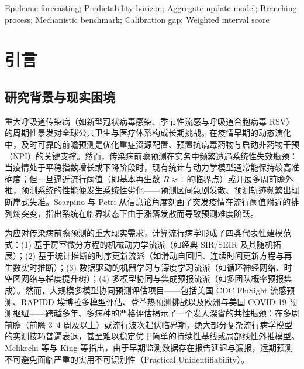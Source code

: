 \documentclass[11pt,a4paper]{article}
\theoremstyle{plain}
\theoremstyle{definition}
\begin{document}
\vspace{0.8em}
 Epidemic forecasting; Predictability horizon; Aggregate update model; Branching process; Mechanistic benchmark; Calibration gap; Weighted interval score

\vspace{1.5em}

\section{引言}\label{sec:intro}

\subsection{研究背景与现实困境}

重大呼吸道传染病（如新型冠状病毒感染、季节性流感与呼吸道合胞病毒 RSV）的周期性暴发对全球公共卫生与医疗体系构成长期挑战。在疫情早期的动态演化中，及时可靠的前瞻预测是优化重症资源配置、预置抗病毒药物与启动非药物干预（NPI）的关键支撑。然而，传染病前瞻预测在实务中频繁遭遇系统性失效瓶颈：当疫情处于平稳指数增长或下降阶段时，现有统计与动力学模型通常能保持较高准确度；但一旦逼近流行阈值（即基本再生数 $R \approx 1$ 的临界点）或开展多周前瞻外推，预测系统的性能便发生系统性劣化——预测区间急剧发散、预测轨迹频繁出现断崖式失准\citep{reich2019collaborative}。Scarpino 与 Petri\citep{scarpino2019predictability} 从信息论角度刻画了突发疫情在流行阈值附近的排列熵突变，指出系统在临界状态下由于涨落发散而导致预测难度阶跃。

为应对传染病前瞻预测的重大现实需求，计算流行病学形成了四类代表性建模范式：(1) 基于房室微分方程的机械动力学流派（如经典 SIR/SEIR 及其随机拓展）；(2) 基于统计推断的时序更新流派（如滑动自回归、连续时间更新方程与再生数实时推断）；(3) 数据驱动的机器学习与深度学习流派（如循环神经网络、时空图网络与梯度提升树）；(4) 多模型协同与集成预报流派（如多团队概率预报集成）。然而，大规模多模型协同预测评估项目——包括美国 CDC FluSight 流感预测\citep{mcgowan2019collaborative, flusight2024evaluation}、RAPIDD 埃博拉多模型评估\citep{viboud2018rapidd}、登革热预测挑战\citep{johansson2019open}以及欧洲与美国 COVID-19 预测枢纽\citep{cramer2022evaluation, sherratt2023europeanhubs}——跨越多年、多病种的严格评估揭示了一个发人深省的共性瓶颈：在多周前瞻（前瞻 3--4 周及以上）或流行波次起伏临界期，绝大部分复杂流行病学模型的实测技巧普遍衰退，甚至难以稳定优于简单的持续性基线或局部线性外推模型\citep{suez2026baseline, lopez2024challenges}。Melikechi 等\citep{melikechi2022limits}与 King 等\citep{king2015avoidable}指出，由于早期监测数据存在报告延迟与漏报，远期预测不可避免面临严重的实用不可识别性（Practical Unidentifiability）。
\end{document}

